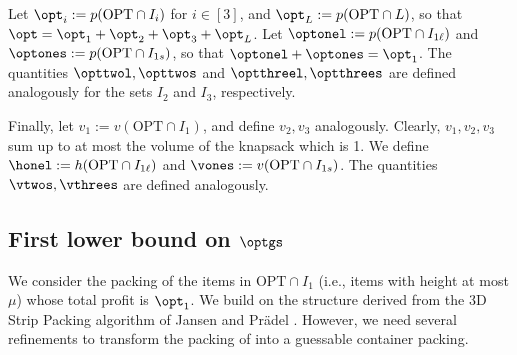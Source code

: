 Let $\opt_i := p(\text{OPT}\cap I_i)$ for $i\in [3]$, and $\opt_L := p(\text{OPT}\cap L)$, so that $\opt = \opt_1+\opt_2+\opt_3+\opt_L$.
Let $\optonel := p(\text{OPT}\cap I_{1\ell})$ and $\optones := p(\text{OPT}\cap I_{1s})$, so that $\optonel+\optones=\opt_1$. The quantities $\opttwol, \opttwos$ and $\optthreel, \optthrees$ are defined analogously for the sets $I_2$ and $I_3$, respectively.

Finally, let $v_1 := v(\text{OPT}\cap I_1)$, and define $v_2, v_3$ analogously.  Clearly, $v_1, v_2, v_3$ sum up to at most the volume of the knapsack which is 1. We define $\honel := h(\text{OPT}\cap I_{1\ell})$ and $\vones := v(\text{OPT}\cap I_{1s})$. The quantities $\vtwos,\vthrees$ are defined analogously.



\subsection{First lower bound on \texorpdfstring{$\optgs$}{optgs}}
\label{sec:firstlb}
We consider the packing of the items in $\text{OPT}\cap I_1$ (i.e., items with height at most $\mu$) whose total profit is $\opt_1$. We build on the structure derived from the 3D Strip Packing algorithm of Jansen and Pr{\"a}del \cite{3d-strip-packing}. 
However, 
we need several refinements to transform the packing of \cite{3d-strip-packing} into a guessable container packing. 



